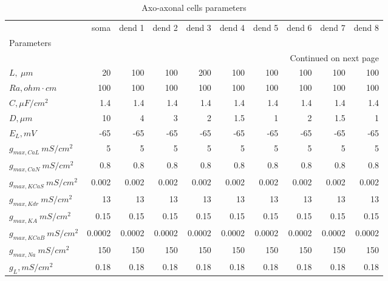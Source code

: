 {\footnotesize
\begin{longtable}{lrrrrrrrrr}
\caption{Axo-axonal cells parameters}\label{ca1_aac_cell_parameters}\\
\toprule
{} &   soma & dend 1 & dend 2 & dend 3 & dend 4 & dend 5 & dend 6 & dend 7 & dend 8 \\
Parameters      &        &        &        &        &        &        &        &        &        \\
\midrule
\endhead
\midrule
\multicolumn{10}{r}{{Continued on next page}} \\
\midrule
\endfoot

\bottomrule
\endlastfoot
$L, \ \mu m$ &     20 &    100 &    100 &    200 &    100 &    100 &    100 &    100 &    100 \\
$Ra,
 ohm \cdot cm$              &    100 &    100 &    100 &    100 &    100 &    100 &    100 &    100 &    100 \\
$C, \mu F / cm^2$              &    1.4 &    1.4 &    1.4 &    1.4 &    1.4 &    1.4 &    1.4 &    1.4 &    1.4 \\
$D, \mu m$            &     10 &      4 &      3 &      2 &    1.5 &      1 &      2 &    1.5 &      1 \\
$E_L,  mV$       &    -65 &    -65 &    -65 &    -65 &    -65 &    -65 &    -65 &    -65 &    -65 \\
$g_{max, CaL    }\  mS / cm^2$&      5 &      5 &      5 &      5 &      5 &      5 &      5 &      5 &      5 \\
$g_{max, CaN    }\  mS / cm^2$&    0.8 &    0.8 &    0.8 &    0.8 &    0.8 &    0.8 &    0.8 &    0.8 &    0.8 \\
$g_{max, KCaS    }\  mS / cm^2$&  0.002 &  0.002 &  0.002 &  0.002 &  0.002 &  0.002 &  0.002 &  0.002 &  0.002 \\
$g_{max, Kdr }\  mS / cm^2$&     13 &     13 &     13 &     13 &     13 &     13 &     13 &     13 &     13 \\
$g_{max, KA     }\  mS / cm^2$&   0.15 &   0.15 &   0.15 &   0.15 &   0.15 &   0.15 &   0.15 &   0.15 &   0.15 \\
$g_{max, KCaB   }\  mS / cm^2$& 0.0002 & 0.0002 & 0.0002 & 0.0002 & 0.0002 & 0.0002 & 0.0002 & 0.0002 & 0.0002 \\
$g_{max, Na     }\  mS / cm^2$&    150 &    150 &    150 &    150 &    150 &    150 &    150 &    150 &    150 \\
$g_L,  mS / cm^2$    &   0.18 &   0.18 &   0.18 &   0.18 &   0.18 &   0.18 &   0.18 &   0.18 &   0.18 \\
\end{longtable}
}